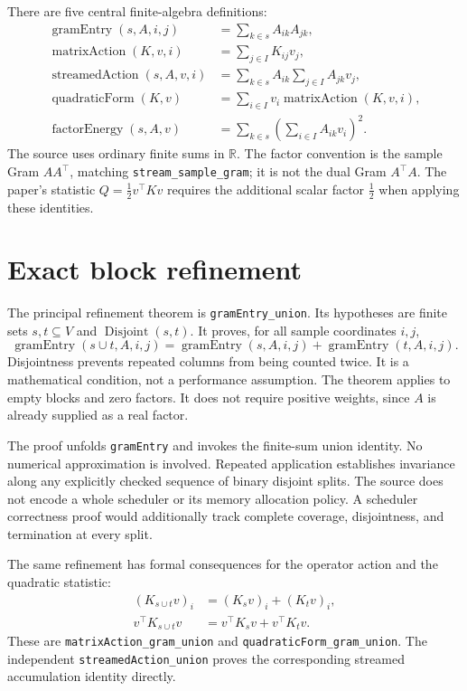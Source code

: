 \documentclass[11pt]{article}
\newcommand{\decl}[1]{\nolinkurl{#1}}
\newcommand{\R}{\mathbb R}
\begin{document}
There are five central finite-algebra definitions:
\begin{align*}
 \operatorname{gramEntry}(s,A,i,j)&=\sum_{k\in s}A_{ik}A_{jk},\\[6pt]
 \operatorname{matrixAction}(K,v,i)&=\sum_{j\in I}K_{ij}v_j,\\[6pt]
 \operatorname{streamedAction}(s,A,v,i)&=\sum_{k\in s}A_{ik}\sum_{j\in I}A_{jk}v_j,\\[6pt]
 \operatorname{quadraticForm}(K,v)&=\sum_{i\in I}v_i\operatorname{matrixAction}(K,v,i),\\[6pt]
 \operatorname{factorEnergy}(s,A,v)&=\sum_{k\in s}\left(\sum_{i\in I}A_{ik}v_i\right)^2.
\end{align*}
The source uses ordinary finite sums in $\R$. The factor convention is the
sample Gram $AA^\top$, matching \decl{stream_sample_gram}; it is not the dual
Gram $A^\top A$. The paper's statistic $Q=\tfrac12 v^\top Kv$ requires the
additional scalar factor $\tfrac12$ when applying these identities.

\section{Exact block refinement}

The principal refinement theorem is \decl{gramEntry_union}. Its hypotheses
are finite sets $s,t\subseteq V$ and $\operatorname{Disjoint}(s,t)$. It proves,
for all sample coordinates $i,j$,
\[
 \operatorname{gramEntry}(s\cup t,A,i,j)
 =\operatorname{gramEntry}(s,A,i,j)+\operatorname{gramEntry}(t,A,i,j).
\]
Disjointness prevents repeated columns from being counted twice. It is a
mathematical condition, not a performance assumption. The theorem applies to
empty blocks and zero factors. It does not require positive weights, since
$A$ is already supplied as a real factor.

The proof unfolds \decl{gramEntry} and invokes the finite-sum union identity.
No numerical approximation is involved. Repeated application establishes
invariance along any explicitly checked sequence of binary disjoint splits.
The source does not encode a whole scheduler or its memory allocation policy.
A scheduler correctness proof would additionally track complete coverage,
disjointness, and termination at every split.

The same refinement has formal consequences for the operator action and the
quadratic statistic:
\begin{align*}
 (K_{s\cup t}v)_i&=(K_s v)_i+(K_t v)_i,\\
 v^\top K_{s\cup t}v&=v^\top K_s v+v^\top K_t v.
\end{align*}
These are \decl{matrixAction_gram_union} and
\decl{quadraticForm_gram_union}. The independent
\decl{streamedAction_union} proves the corresponding streamed accumulation
identity directly.
\end{document}
